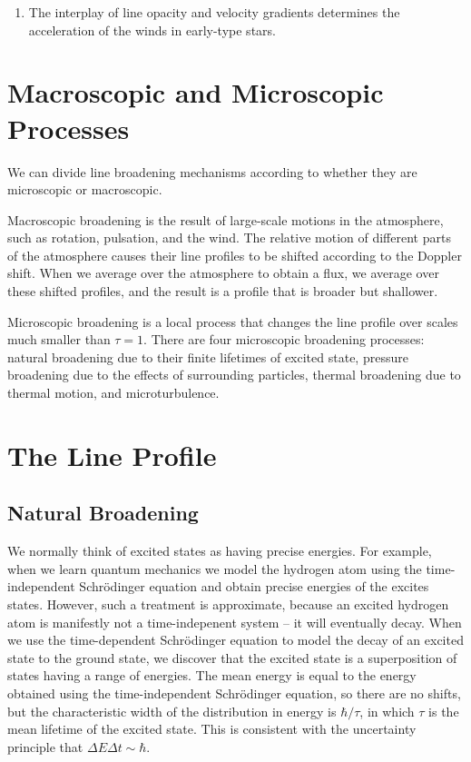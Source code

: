 \begin{enumerate}

\item
The interplay of line opacity and velocity gradients determines the
acceleration of the winds in early-type stars.

\end{enumerate}

\newslide

\section{Macroscopic and Microscopic Processes}

We can divide line broadening mechanisms according to whether they are
microscopic or macroscopic.

Macroscopic broadening is the result of large-scale motions in the
atmosphere, such as rotation, pulsation, and the wind. The relative motion
of different parts of the atmosphere causes their line profiles to be
shifted according to the Doppler shift. When we average over the
atmosphere to obtain a flux, we average over these shifted profiles, and
the result is a profile that is broader but shallower.

Microscopic broadening is a local process that changes the line profile
over scales much smaller than $\tau = 1$. There are four microscopic
broadening processes: natural broadening due to their finite lifetimes
of excited state, pressure broadening due to the effects of surrounding
particles, thermal broadening due to thermal motion, and
microturbulence.

\newslide

\section{The Line Profile}

\subsection{Natural Broadening}

We normally think of excited states as having precise energies. For
example, when we learn quantum mechanics we model the hydrogen atom
using the time-independent Schr\"odinger equation and obtain precise
energies of the excites states. However, such a treatment is
approximate, because an excited hydrogen atom is manifestly not a
time-indepenent system -- it will eventually decay. When we use the
time-dependent Schr\"odinger equation to model the decay of an excited
state to the ground state, we discover that the excited state is a
superposition of states having a range of energies. The mean energy is
equal to the energy obtained using the time-independent Schr\"odinger
equation, so there are no shifts, but the characteristic width of the
distribution in energy is $\hbar/\tau$, in which $\tau$ is the mean
lifetime of the excited state. This is consistent with the uncertainty
principle that $\Delta E \Delta t \sim \hbar$.

